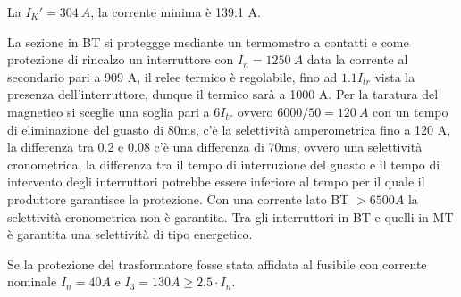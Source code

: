 La $I_K' = 304\ A$, la corrente minima è 139.1 A.


La sezione in BT si proteggge mediante un termometro a contatti e come protezione di rincalzo un interruttore con $I_n = 1250\ A$ data la corrente al secondario pari a 909 A, il relee termico è regolabile, fino ad $1.1I_{tr}$ vista la presenza dell'interruttore, dunque il termico sarà a 1000 A.
Per la taratura del magnetico si sceglie una soglia pari a $6I_{tr}$ ovvero $6000/50 = 120\ A$ con un tempo di eliminazione del guasto di 80ms, c'è la selettività amperometrica fino a 120 A, la differenza tra 0.2 e 0.08 c'è una differenza di 70ms, ovvero una selettività cronometrica, la differenza tra il tempo di interruzione del guasto e il tempo di intervento degli interruttori potrebbe essere inferiore al tempo per il quale il produttore garantisce la protezione. Con una corrente lato BT $> 6500 A$ la selettività cronometrica non è garantita.
Tra gli interruttori in BT e quelli in MT è garantita una selettività di tipo energetico. 

Se la protezione del trasformatore fosse stata affidata al fusibile con corrente nominale $I_n = 40 A$ e $I_3 = 130A \geq 2.5\cdot I_n$.




